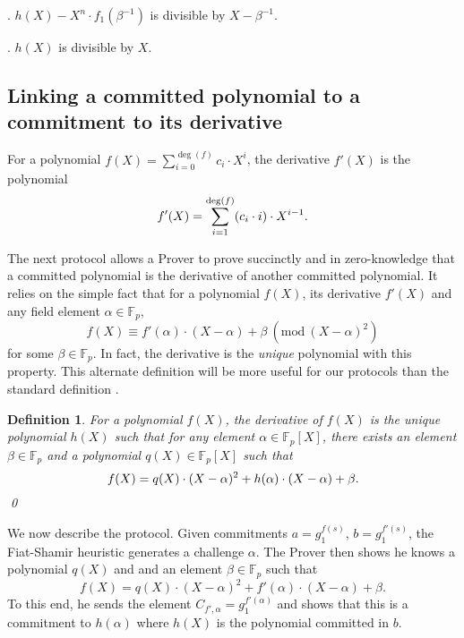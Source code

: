 \documentclass[11pt, lettersize, notitlepage, leqno, footskip=0.6cm]{article}
\newcommand{\bFp}{\mathbb{F}_p}
\newcommand{\al}{\alpha}
\newcommand{\be}{\beta}
\newcommand{\vs}{\vspace{-0.15cm}}
\newcommand{\noin}{\noindent}
\newcommand{\Mod}[1]{\ (\mathrm{mod}\ #1)}
\newtheorem{Def}{Definition}[section]
\numberwithin{equation}{section}
\begin{document}
\noin 1. $h(X) - X^n\cdot f_1(\be^{-1})$ is divisible by $X-\be^{-1}$. \vspace{1mm}

\noin 2. $h(X)$ is divisible by $X$. \vspace{2mm}

\subsection{\fontsize{11}{11}\selectfont Linking a committed polynomial to a commitment to its derivative}


For a polynomial $f(X) = \sum\limits_{i=0}^{\deg(f)} c_i\cdot X^i$, the derivative $f'(X)$ is the polynomial \vspace{-2.5mm} $$f'(X) = \sum\limits_{i=1}^{\deg(f)} (c_i\cdot i)\cdot X^{i-1}. \vs $$


\noin The next protocol allows a Prover to prove succinctly and in zero-knowledge that  a committed polynomial is the derivative of another committed polynomial. It relies on the simple fact that for a polynomial $f(X)$, its derivative $f'(X)$ and any field element $\al\in \bFp$,  $$ f(X) \equiv f'(\al)\cdot (X-\al) + \be  \Mod{(X-\al)^2}  $$ for some $\be \in \bFp$. In fact, the derivative is the \textit{unique} polynomial with this property. This alternate definition will be more useful for our protocols than the standard definition .

\begin{comment} In fact, the derivative of $f(X)$ can be alternatively defined as the unique polynomial $h(X)$ such that for any $\al\in \bFp$, there exists an element $\be\in \bFp$ such that \vs $$ f(X)\equiv h(\al)(X-\al) + \be\Mod{(X-\al)^2}. \vs $$  \end{comment}


\begin{Def} \normalfont For a polynomial $f(X)$, \textit{the derivative} of $f(X)$ is the unique polynomial $h(X)$ such that for any element $\al\in \bFp[X]$, there exists an element $\be\in \bFp$ and a polynomial $q(X)\in \bFp[X]$ such that $$ f(X) = q(X)\cdot (X-\al)^2 + h(\al)\cdot (X-\al)+\be. \vspace{-7mm} $$ \qed \end{Def}


We now describe the protocol. Given commitments $a = g_1^{f(s)}$, $b = g_1^{f'(s)}$, the Fiat-Shamir heuristic generates a challenge $\al$. The Prover then shows he knows a polynomial $q(X)$ and and an element $\be\in \bFp$ such that $$ f(X) = q(X)\cdot (X-\al)^2 + f'(\al)\cdot(X-\al)+\be. $$ To this end, he sends the element $C_{f',\al} =  g_1^{f'(\al)}$ and shows that this is a commitment to $h(\al)$ where $h(X)$ is the polynomial committed in $b$.    
\end{document}
